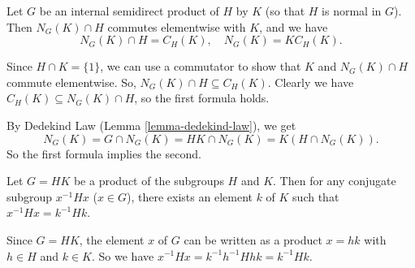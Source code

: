 \begin{lemma} \label{lemma-semidirect-prod-C-and-N}
	Let $G$ be an internal semidirect product of $H$ by $K$ (so that $H$ is normal in $G$). Then $N_G(K) \cap H$ commutes elementwise with $K$, and we have
	$$N_G(K) \cap H = C_H(K), \quad N_G(K) = KC_H(K).$$
\end{lemma}
\begin{sketch}
	Since $H \cap K = \{1\}$, we can use a commutator to show that $K$ and $N_G(K) \cap H$ commute elementwise. So, $N_G(K) \cap H \subseteq C_H(K)$. Clearly we have
	$C_H(K) \subseteq N_G(K) \cap H$,
	so the first formula holds.
	
	By Dedekind Law (Lemma \ref{lemma-dedekind-law}), we get
	$$N_G(K) = G \cap N_G(K) = HK \cap N_G(K) = K(H \cap N_G(K)).$$
	So the first formula implies the second.
\end{sketch}

\begin{lemma} \label{lemma-HK-and-conjugate}
	Let $G = HK$ be a product of the subgroups $H$ and $K$. Then for any conjugate subgroup $x^{-1}Hx$ ($x\in G$), there exists an element $k$ of $K$ such that $x^{-1}Hx = k^{-1}Hk$.
\end{lemma}
\begin{sketch}
	Since $G = HK$, the element $x$ of $G$ can be written as a product $x = hk$ with $h\in H$ and $k\in K$. So we have
	$x^{-1}Hx = k^{-1}h^{-1}Hhk = k^{-1}Hk$.
\end{sketch}

